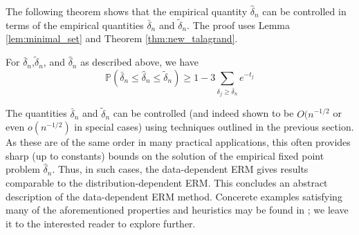   The following theorem shows that the empirical quantity $\hat{\delta}_n$ can be controlled in terms of the empirical quantities $\bar{\delta}_n$ and $\tilde{\delta}_n$. The proof uses Lemma \ref{lem:minimal_set} and Theorem \ref{thm:new_talagrand}.

  \begin{theorem}\label{thm:data_final}
  For $\bar{\delta}_n$,$\tilde{\delta}_n$, and $\hat{\delta}_n$ as described above, we have
  \[\mathbb{P}(\bar{\delta}_n \leq \hat{\delta}_n \leq \tilde{\delta}_n) \geq 1 - 3 \sum_{\delta_j \geq \bar{\delta}_n} e^{-t_j}\]
\end{theorem}

The quantities $\bar{\delta}_n$ and $\tilde{\delta}_n$ can be controlled (and indeed shown to be $O(n^{-1/2}$ or even $o(n^{-1/2})$ in special cases) using techniques outlined in the previous section. As these are of the same order in many practical applications, this often provides sharp (up to constants) bounds on the solution of the empirical fixed point problem $\hat{\delta}_n$. Thus, in such cases, the data-dependent ERM gives results comparable to the distribution-dependent ERM. This concludes an abstract description of the data-dependent ERM method. Concerete examples satisfying many of the aforementioned properties and heuristics may be found in \cite{koltchinskii2008}; we leave it to the interested reader to explore further.